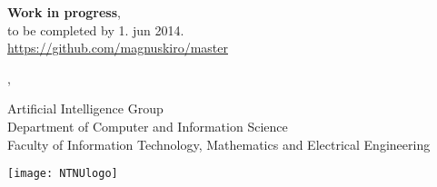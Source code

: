\begin{titlepage}
    \noindent {\large \textbf{\thesisAuthor} \small \today}
    \vspace{2cm}

\nohyphens{ 
    \noindent {\Huge \thesisTitle}
    \vspace{2cm}
}

    \noindent 
        \huge \textbf{Work in progress},
        \\ \Large to be completed by 1. jun 2014.
        \\ \url{https://github.com/magnuskiro/master}
	
    \vspace{1cm}

    \noindent \thesisType, \date{\today}
    \vspace{1cm}

    \noindent
    Artificial Intelligence Group\\
    Department of Computer and Information Science\\
    Faculty of Information Technology, Mathematics and Electrical Engineering\\

    \vfill
    \begin{center}
        \texttt{[image: NTNUlogo]}
    \end{center}
\end{titlepage}

